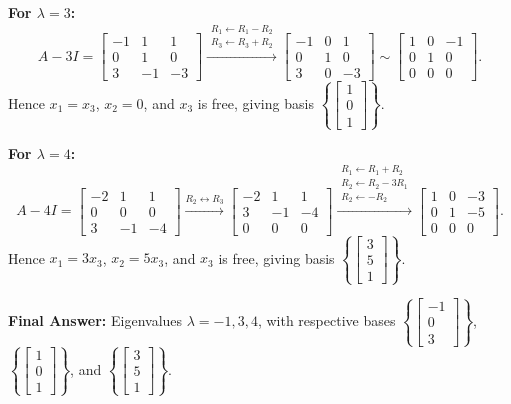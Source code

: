 \documentclass[11pt, letterpaper]{article}
\theoremstyle{definition}
\theoremstyle{remark}
\begin{document}
\textbf{For $\lambda = 3$:}
\[
A - 3I = \begin{bmatrix} -1 & 1 & 1 \\ 0 & 1 & 0 \\ 3 & -1 & -3 \end{bmatrix}
\xrightarrow{\substack{R_1 \leftarrow R_1 - R_2 \\ R_3 \leftarrow R_3 + R_2}}
\begin{bmatrix} -1 & 0 & 1 \\ 0 & 1 & 0 \\ 3 & 0 & -3 \end{bmatrix}
\sim
\begin{bmatrix} 1 & 0 & -1 \\ 0 & 1 & 0 \\ 0 & 0 & 0 \end{bmatrix}.
\]
Hence $x_1 = x_3$, $x_2 = 0$, and $x_3$ is free, giving basis $\left\{ \begin{bmatrix} 1 \\ 0 \\ 1 \end{bmatrix} \right\}$.

\textbf{For $\lambda = 4$:}
\[
A - 4I = \begin{bmatrix} -2 & 1 & 1 \\ 0 & 0 & 0 \\ 3 & -1 & -4 \end{bmatrix}
\xrightarrow{R_2 \leftrightarrow R_3}
\begin{bmatrix} -2 & 1 & 1 \\ 3 & -1 & -4 \\ 0 & 0 & 0 \end{bmatrix}
\xrightarrow{\substack{R_1 \leftarrow R_1 + R_2 \\ R_2 \leftarrow R_2 - 3R_1 \\ R_2 \leftarrow -R_2}}
\begin{bmatrix} 1 & 0 & -3 \\ 0 & 1 & -5 \\ 0 & 0 & 0 \end{bmatrix}.
\]
Hence $x_1 = 3x_3$, $x_2 = 5x_3$, and $x_3$ is free, giving basis $\left\{ \begin{bmatrix} 3 \\ 5 \\ 1 \end{bmatrix} \right\}$.

\textbf{Final Answer:} Eigenvalues $\lambda = -1, 3, 4$, with respective bases $\left\{ \begin{bmatrix} -1 \\ 0 \\ 3 \end{bmatrix} \right\}$, $\left\{ \begin{bmatrix} 1 \\ 0 \\ 1 \end{bmatrix} \right\}$, and $\left\{ \begin{bmatrix} 3 \\ 5 \\ 1 \end{bmatrix} \right\}$.
\end{document}
